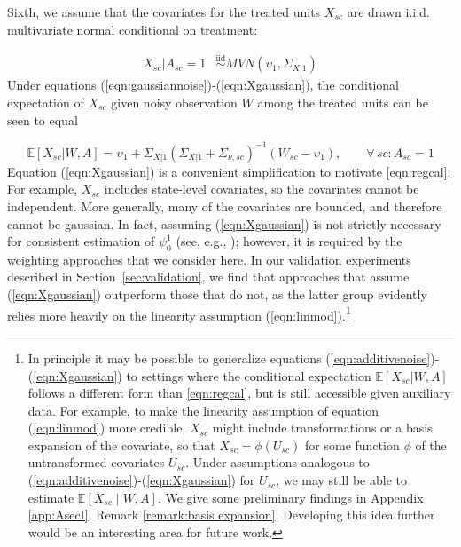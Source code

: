 \documentclass[aoas]{imsart}
\theoremstyle{plain}
\theoremstyle{remark}
\begin{document}
Sixth, we assume that the covariates for the treated units $X_{sc}$ are drawn i.i.d. multivariate normal conditional on treatment:

\begin{align} \label{eqn:Xgaussian}
    X_{sc}|A_{sc} = 1 & \stackrel{\text{iid}}{\sim} MVN(\upsilon_1, \Sigma_{X|1})%
\end{align}
%
Under equations (\ref{eqn:gaussiannoise})-(\ref{eqn:Xgaussian}), the conditional expectation of $X_{sc}$ given noisy observation $W$ among the treated units can be seen to equal 

\begin{equation} \label{eqn:regcal}
\mathbb{E}[X_{sc}| W, A] = \upsilon_1 + \Sigma_{X|1} \left(\Sigma_{X|1} + \Sigma_{\nu, sc}\right)^{-1}  (W_{sc} - \upsilon_1), \qquad \forall\, sc: A_{sc} = 1
\end{equation}
%
Equation (\ref{eqn:Xgaussian}) is a convenient simplification to motivate \eqref{eqn:regcal}. For example, $X_{sc}$ includes state-level covariates, so the covariates cannot be independent. More generally, many of the covariates are bounded, and therefore cannot be gaussian. In fact, assuming (\ref{eqn:Xgaussian}) is not strictly necessary for consistent estimation of $\psi_0^1$ (see, e.g., \cite{gleser1992importance}); however, it is required by the weighting approaches that we consider here. In our validation experiments described in Section~\ref{sec:validation}, we find that approaches that assume (\ref{eqn:Xgaussian}) outperform those that do not, as the latter group evidently relies more heavily on the linearity assumption (\ref{eqn:linmod}).\footnote{In principle it may be possible to generalize equations (\ref{eqn:additivenoise})-(\ref{eqn:Xgaussian}) to settings where the conditional expectation $\mathbb{E}[X_{sc}|W,A]$ follows a different form than \eqref{eqn:regcal}, but is still accessible given auxiliary data. For example, to make the linearity assumption of equation (\ref{eqn:linmod}) more credible, $X_{sc}$ might include transformations or a basis expansion of the covariate, so that $X_{sc} = \phi(U_{sc})$ for some function $\phi$ of the untransformed covariates $U_{sc}$. Under assumptions analogous to (\ref{eqn:additivenoise})-(\ref{eqn:Xgaussian}) for $U_{sc}$, we may still be able to estimate $\mathbb{E}[X_{sc} \mid W, A]$. We give some preliminary findings in Appendix \ref{app:AsecI}, Remark \ref{remark:basis expansion}. Developing this idea further would be an interesting area for future work.}
 
\end{document}
